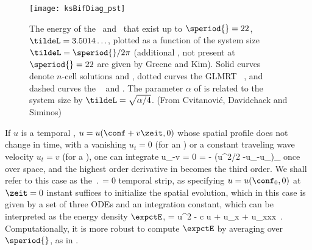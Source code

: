 
\begin{figure}[t]
\begin{center}
\texttt{[image: ksBifDiag\_pst]}
\end{center}
\caption{\label{fig:SCD07ksBifDiag}
The energy  %
of the \eqva\ and \reqva\ that
exist up to $\speriod{}=22$, $\tildeL = 3.5014\ldots$, plotted as a function
of the system size $\tildeL = \speriod{}/2\pi$ (additional \eqva, not present
at $\speriod{} = 22$ are given by Greene and Kim). Solid curves denote
$n$-cell solutions  and , dotted curves the GLMRT
\eqv\ ,
and dashed curves the \reqva\  and .
The parameter $\alpha$ of  is
related to the system size by $\tildeL=\sqrt{\alpha/4}$.
(From Cvitanovi{\'c}, Davidchack and Siminos)
        }
\end{figure}

If $u$ is a temporal \eqv, $u = u(\conf+v\zeit,0)$ whose spatial profile
does not change in time, with a vanishing $u_t=0$ (for an \eqv) or a constant
traveling wave velocity $u_t=v$ (for a \reqv), one can integrate 
\beq
    u_\zeit -v = 0
    = - \left(u^2/2 -u_{\conf}-u_{\conf \conf \conf}\right)_{\conf}
\label{e-ksSteady}
\eeq
once over space, and the highest order derivative in 
becomes the third order. We shall
refer to this case as the $\period{}=0$ temporal strip, as specifying $u
= u(\conf_0,0)$ at $\zeit=0$ instant suffices to initialize the spatial
evolution, which in this case is given by a set of three ODEs and an
integration constant, which can be interpreted as the energy density $\expctE$,
\beq
\expctE = {\textstyle{}}u^2 - c u + u_x + u_{xxx}
\,.
\label{SCD07eq:stdks}
\eeq
Computationally, it is more robust to compute $\expctE$ by averaging over $\speriod{}$,
as in .

